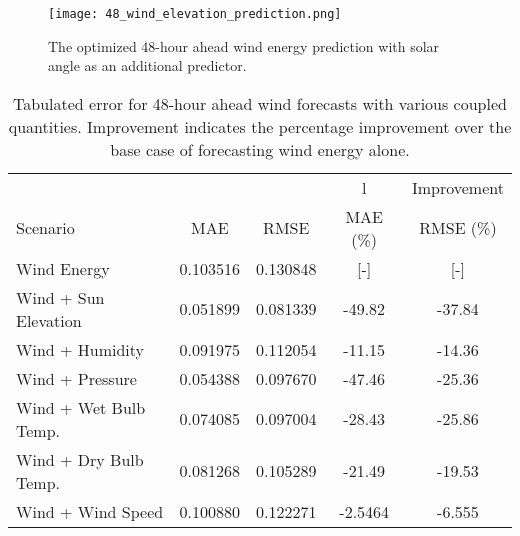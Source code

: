 \begin{figure*}[ht]
  \centering
  \texttt{[image: 48\_wind\_elevation\_prediction.png]}
  \caption{The optimized 48-hour ahead wind energy prediction with solar angle as an additional predictor.}
  \label{fig:wind48}
\end{figure*}
  \begin{table*}[ht]
    \centering
    \caption{Tabulated error for 48-hour ahead wind forecasts with various coupled quantities. Improvement indicates the percentage improvement over the base case of forecasting wind energy alone.}
    \label{tab:wind48}
    \begin{tabular}{l|c|c|c|c}
      &  & & l & Improvement \\
      Scenario  & MAE & RMSE & MAE (\%) & RMSE (\%)\\
      \hline
      Wind Energy & 0.103516 & 0.130848 & [-] & [-] \\
      Wind + Sun Elevation & 0.051899 & 0.081339 & -49.82 & -37.84\\
      Wind + Humidity & 0.091975 & 0.112054 & -11.15 & -14.36\\
      Wind + Pressure & 0.054388 & 0.097670 & -47.46 & -25.36\\
      Wind + Wet Bulb Temp. & 0.074085 & 0.097004 & -28.43 & -25.86\\
      Wind + Dry Bulb Temp. & 0.081268 & 0.105289 & -21.49 & -19.53\\
      Wind + Wind Speed & 0.100880 & 0.122271 & -2.5464 &-6.555 \\
    \end{tabular}
  \end{table*}
